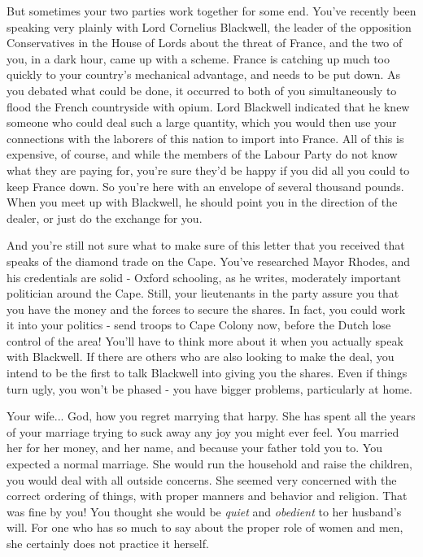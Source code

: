 \documentclass[char]{airship}
\begin{document}
But sometimes your two parties work together for some end. You've
recently been speaking very plainly with Lord Cornelius Blackwell, the
leader of the opposition Conservatives in the House of Lords about the
threat of France, and the two of you, in a dark hour, came up with a
scheme. France is catching up much too quickly to your country's
mechanical advantage, and needs to be put down. As you debated what
could be done, it occurred to both of you simultaneously to flood the
French countryside with opium. Lord Blackwell indicated that he knew
someone who could deal such a large quantity, which you would then
use your connections with the laborers of this nation to import into
France. All of this is expensive, of course, and while the members of
the Labour Party do not know what they are paying for, you're sure
they'd be happy if you did all you could to keep France down. So
you're here with an envelope of several thousand pounds. When you meet
up with Blackwell, he should point you in the direction of the dealer,
or just do the exchange for you.

And you're still not sure what to make sure of this letter that you
received that speaks of the diamond trade on the Cape. You've researched
Mayor Rhodes, and his credentials are solid - Oxford schooling, as he writes,
moderately important politician around the Cape. Still, your lieutenants
in the party assure you that you have the money and the forces to secure the
shares. In fact, you could work it into your politics - send troops to Cape
Colony now, before the Dutch lose control of the area! You'll have to think
more about it when you actually speak with Blackwell.  If there are others who 
are also looking to make the deal, you intend to be the first to talk Blackwell
into giving you the shares. Even if things turn ugly, you won't be phased - you 
have bigger problems, particularly at home.

Your wife... God, how you regret marrying that harpy. She has spent
all the years of your marriage trying to suck away any joy you might
ever feel. You married her for her money, and her name, and because
your father told you to. You expected a normal marriage. She would run
the household and raise the children, you would deal with all outside
concerns. She seemed very concerned with the correct ordering of
things, with proper manners and behavior and religion. That was fine
by you! You thought she would be {\em quiet} and {\em obedient} to her
husband's will. For one who has so much to say about the proper role
of women and men, she certainly does not practice it herself.
\end{document}
